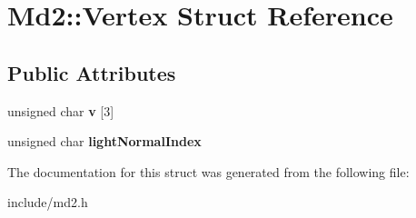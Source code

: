 \hypertarget{structMd2_1_1Vertex}{\section{Md2\-:\-:Vertex Struct Reference}
\label{structMd2_1_1Vertex}
}
\subsection*{Public Attributes}
\begin{DoxyCompactItemize}
\item 
\hypertarget{structMd2_1_1Vertex_a180ab83d032bf63809050af79c1b8f34}{unsigned char {\bfseries v} \mbox{[}3\mbox{]}}\label{structMd2_1_1Vertex_a180ab83d032bf63809050af79c1b8f34}

\item 
\hypertarget{structMd2_1_1Vertex_ad5bfc7e6d7f803f53dca649e7ba9e251}{unsigned char {\bfseries light\-Normal\-Index}}\label{structMd2_1_1Vertex_ad5bfc7e6d7f803f53dca649e7ba9e251}

\end{DoxyCompactItemize}


The documentation for this struct was generated from the following file\-:\begin{DoxyCompactItemize}
\item 
include/md2.\-h\end{DoxyCompactItemize}
